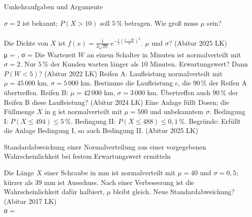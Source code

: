 \setcounter{aufgabe}{11}

\begin{aufgabe}{Umkehraufgaben und Argumente}
\begin{teile}
\teil $\sigma = 2$ ist bekannt; $P(X > 10)$ soll $5\,\%$ betragen. Wie groß muss $\mu$ sein? \\  \\ 
\teil Die Dichte von $X$ ist $f(x) = \frac{1}{3\sqrt{2\pi}} \, \mathrm{e}^{-\frac{1}{2}\left(\frac{x - 40}{3}\right)^2}$. $\mu$ und $\sigma$? \hfill (Abitur 2025 LK) \\ μ = \leerfeld , σ = \leerfeld
\teil Die Wartezeit $W$ an einem Schalter in Minuten ist normalverteilt mit $\sigma = 2$. Nur $5\,\%$ der Kunden warten länger als $10$ Minuten. Erwartungswert? Dann $P(W < 5)$? \hfill (Abitur 2022 LK)
\teil Reifen A: Laufleistung normalverteilt mit $\mu = 45\,000$ km, $\sigma = 5\,000$ km. Bestimme die Laufleistung $c$, die $90\,\%$ der Reifen A übertreffen. Reifen B: $\mu = 42\,000$ km, $\sigma = 3\,000$ km. Übertreffen auch $90\,\%$ der Reifen B diese Laufleistung? \hfill (Abitur 2024 LK)
\teil Eine Anlage füllt Dosen; die Füllmenge $X$ in g ist normalverteilt mit $\mu = 500$ und unbekanntem $\sigma$. Bedingung I: $P(X \le 494) \le 5\,\%$. Bedingung II: $P(X \le 488) \le 0{,}1\,\%$. Begründe: Erfüllt die Anlage Bedingung I, so auch Bedingung II. \hfill (Abitur 2025 LK)
\end{teile}
\end{aufgabe}

\begin{aufgabe}{Standardabweichung einer Normalverteilung aus einer vorgegebenen Wahrscheinlichkeit bei festem Erwartungswert ermitteln}
\begin{teile}
\teil Die Länge $X$ einer Schraube in mm ist normalverteilt mit $\mu = 40$ und $\sigma = 0{,}5$; kürzer als $39$ mm ist Ausschuss. Nach einer Verbesserung ist die Wahrscheinlichkeit dafür halbiert, $\mu$ bleibt gleich. Neue Standardabweichung? \hfill (Abitur 2017 LK) \\ σ = \leerfeld
\end{teile}
\end{aufgabe}


